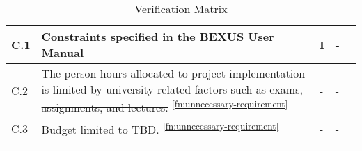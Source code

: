 \begin{longtable}[]{|m{}| m{} |m{} |m{}|m{}|}
C.1  & Constraints specified in the BEXUS User Manual                                                                                                                          &       I       & -            &        \\ \hline
C.2  & \st{The person-hours allocated to project implementation is limited by university related factors such as exams, assignments, and lectures.} \textsuperscript{\ref{fn:unnecessary-requirement}}                                &      -        & -            &        \\ \hline
C.3  & \st{Budget limited to TBD.} \textsuperscript{\ref{fn:unnecessary-requirement}}                                                                                                                                                 &      -        & -            &        \\ \hline

\caption{Verification Matrix}
\label{tab:var-mat}
\end{longtable}
\raggedbottom